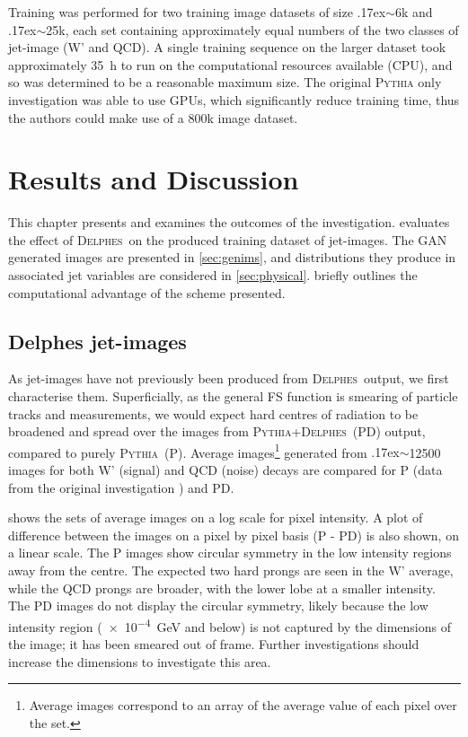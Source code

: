 \documentclass{report}
\newcommand{\pkg}[1]{\textsc{#1}}
\newcommand{\pythia}{\pkg{Pythia}}
\newcommand{\delphes}{\pkg{Delphes}}
\newcommand{\around}{{\raise.17ex\hbox{$\scriptstyle\sim$}}}
\begin{document}
Training was performed for two training image datasets of size \around6k and \around25k, each set containing approximately equal numbers of the two classes of jet-image (W' and QCD). A single training sequence on the larger dataset took approximately \SI{35}{\hour} to run on the computational resources available (CPU), and so was determined to be a reasonable maximum size. The original \pkg{Pythia} only investigation was able to use GPUs, which significantly reduce training time, thus the authors could make use of a 800k image dataset.


\chapter{Results and Discussion}
\label{sec:results}

This chapter presents and examines the outcomes of the investigation.  evaluates the effect of \delphes~on the produced training dataset of jet-images. The GAN generated images are presented in \cref{sec:genims}, and distributions they produce in associated jet variables are considered in \cref{sec:physical}.  briefly outlines the computational advantage of the scheme presented.

\section{Delphes jet-images}
\label{sec:delphes-ims}

As jet-images have not previously been produced from \delphes~output, we first characterise them. Superficially, as the general FS function is smearing of particle tracks and measurements, we would expect hard centres of radiation to be broadened and spread over the images from \pythia+\delphes~(PD) output, compared to purely \pythia~(P). Average images\footnote{Average images correspond to an array of the average value of each pixel over the set.} generated from \around\num{12500} images for both W' (signal) and QCD (noise) decays are compared for P (data from the original investigation \cite{de2017learning}) and PD. 

 shows the sets of average images on a log scale for pixel intensity. A plot of difference between the images on a pixel by pixel basis (P - PD) is also shown, on a linear scale. The P images show circular symmetry in the low intensity regions away from the centre. The expected two hard prongs are seen in the W' average, while the QCD prongs are broader, with the lower lobe at a smaller intensity. The PD images do not display the circular symmetry, likely because the low intensity region (\SI{e-4}{\giga\electronvolt} and below) is not captured by the dimensions of the image; it has been smeared out of frame. Further investigations should increase the dimensions to investigate this area.
\end{document}
